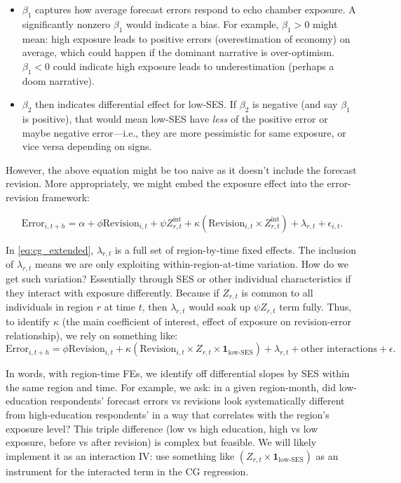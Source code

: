 \documentclass[12pt]{article}
\begin{document}
\begin{itemize}
    \item $\beta_1$ captures how average forecast errors respond to echo chamber exposure. A significantly nonzero $\beta_1$ would indicate a bias. For example, $\beta_1 > 0$ might mean: high exposure leads to positive errors (overestimation of economy) on average, which could happen if the dominant narrative is over-optimism. $\beta_1 < 0$ could indicate high exposure leads to underestimation (perhaps a doom narrative).
    \item $\beta_2$ then indicates differential effect for low-SES. If $\beta_2$ is negative (and say $\beta_1$ is positive), that would mean low-SES have \emph{less} of the positive error or maybe negative error—i.e., they are more pessimistic for same exposure, or vice versa depending on signs.

\end{itemize}
However, the above equation might be too naive as it doesn't include the forecast revision. More appropriately, we might embed the exposure effect into the error-revision framework:

\begin{equation}
    \label{eq:cg_extended}
    \text{Error}_{i,t+h} = \alpha + \phi \text{Revision}_{i,t} + \psi Z^{\text{int}}_{r,t} + \kappa \left(\text{Revision}_{i,t} \times Z^{\text{int}}_{r,t}\right) + \lambda_{r,t} + \epsilon_{i,t}.
\end{equation}

In \eqref{eq:cg_extended}, $\lambda_{r,t}$ is a full set of region-by-time fixed effects. The inclusion of $\lambda_{r,t}$ means we are only exploiting within-region-at-time variation. How do we get such variation? Essentially through SES or other individual characteristics if they interact with exposure differently. Because if $Z_{r,t}$ is common to all individuals in region $r$ at time $t$, then $\lambda_{r,t}$ would soak up $\psi Z_{r,t}$ term fully. Thus, to identify $\kappa$ (the main coefficient of interest, effect of exposure on revision-error relationship), we rely on something like:
$$
    \text{Error}_{i,t+h}=\phi \text{Revision}_{i,t}+ \kappa (\text{Revision}_{i,t} \times Z_{r,t} \times \mathbf{1}_{\text{low-SES}})+\lambda_{r,t}+\text{other interactions}+\epsilon.
$$

In words, with region-time FEs, we identify off differential slopes by SES within the same region and time. For example, we ask: in a given region-month, did low-education respondents' forecast errors vs revisions look systematically different from high-education respondents' in a way that correlates with the region's exposure level? This triple difference (low vs high education, high vs low exposure, before vs after revision) is complex but feasible. We will likely implement it as an interaction IV: use something like $(Z_{r,t} \times \mathbf{1}_{\text{low-SES}})$ as an instrument for the interacted term in the CG regression.
\end{document}
